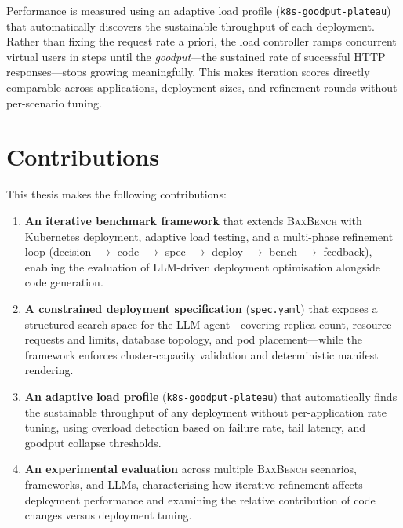Performance is measured using an adaptive load profile
(\texttt{k8s-goodput-plateau}) that automatically discovers the sustainable
throughput of each deployment.  Rather than fixing the request rate a priori,
the load controller ramps concurrent virtual users in steps until the
\emph{goodput}---the sustained rate of successful HTTP responses---stops
growing meaningfully.  This makes iteration scores directly comparable across
applications, deployment sizes, and refinement rounds without per-scenario
tuning.


\section{Contributions}
\label{sec:intro-contributions}

This thesis makes the following contributions:
%
\begin{enumerate}
  \item \textbf{An iterative benchmark framework} that extends
        \textsc{BaxBench} with Kubernetes deployment, adaptive load testing,
        and a multi-phase refinement loop
        (decision~$\to$ code~$\to$ spec~$\to$ deploy~$\to$ bench~$\to$
        feedback), enabling the evaluation of LLM-driven deployment
        optimisation alongside code generation.

  \item \textbf{A constrained deployment specification} (\texttt{spec.yaml})
        that exposes a structured search space for the LLM agent---covering
        replica count, resource requests and limits, database topology, and pod
        placement---while the framework enforces cluster-capacity validation
        and deterministic manifest rendering.

  \item \textbf{An adaptive load profile} (\texttt{k8s-goodput-plateau}) that
        automatically finds the sustainable throughput of any deployment
        without per-application rate tuning, using overload detection based on
        failure rate, tail latency, and goodput collapse thresholds.

  \item \textbf{An experimental evaluation} across multiple \textsc{BaxBench}
        scenarios, frameworks, and LLMs, characterising how iterative
        refinement affects deployment performance and examining the relative
        contribution of code changes versus deployment tuning.
\end{enumerate}


